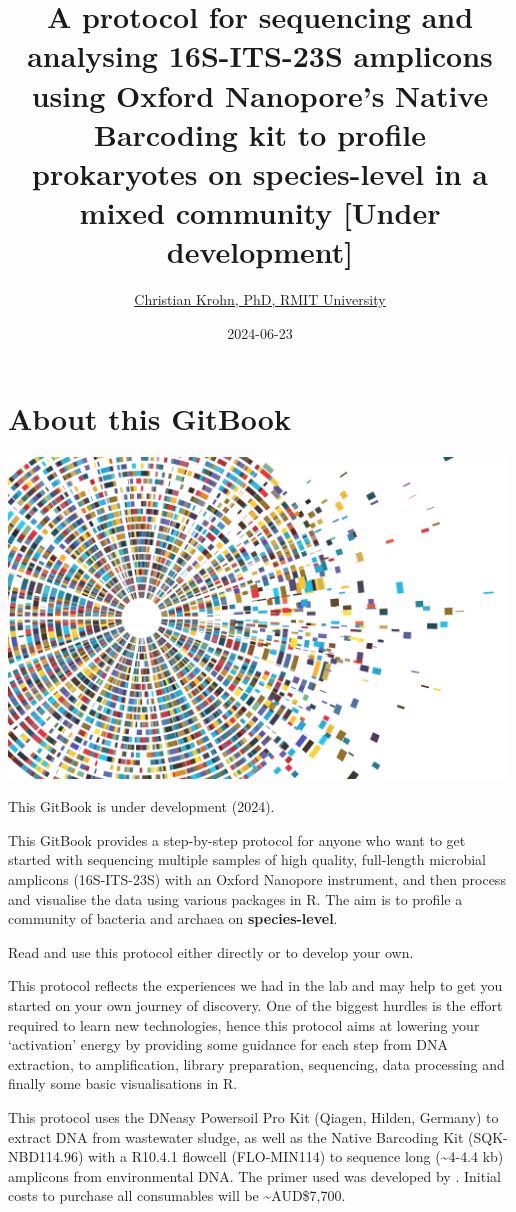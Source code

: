 \documentclass[
]{book}
\title{A protocol for sequencing and analysing 16S-ITS-23S amplicons using Oxford Nanopore's Native Barcoding kit to profile prokaryotes on species-level in a mixed community {[}Under development{]}}
\author{\href{https://www.rmit.edu.au/contact/staff-contacts/academic-staff/k/krohn---christian}{Christian Krohn, PhD, RMIT University}}
\date{2024-06-23}
\begin{document}
\maketitle

{
\setcounter{tocdepth}{1}
\tableofcontents
}
\chapter{About this GitBook}\label{about}

\includegraphics[width=5.20833in,height=\textheight]{./img/vectorstock_23650232.jpg}

This GitBook is under development (2024).

This GitBook provides a step-by-step protocol for anyone who want to get started with sequencing multiple samples of high quality, full-length microbial amplicons (16S-ITS-23S) with an Oxford Nanopore instrument, and then process and visualise the data using various packages in R. The aim is to profile a community of bacteria and archaea on \textbf{species-level}.

Read and use this protocol either directly or to develop your own.

This protocol reflects the experiences we had in the lab and may help to get you started on your own journey of discovery. One of the biggest hurdles is the effort required to learn new technologies, hence this protocol aims at lowering your `activation' energy by providing some guidance for each step from DNA extraction, to amplification, library preparation, sequencing, data processing and finally some basic visualisations in R.

This protocol uses the DNeasy Powersoil Pro Kit (Qiagen, Hilden, Germany) to extract DNA from wastewater sludge, as well as the Native Barcoding Kit (SQK-NBD114.96) with a R10.4.1 flowcell (FLO-MIN114) to sequence long (\textasciitilde4-4.4 kb) amplicons from environmental DNA. The primer used was developed by \citep{Martijn2019}. Initial costs to purchase all consumables will be \textasciitilde AUD\$7,700.
\end{document}
